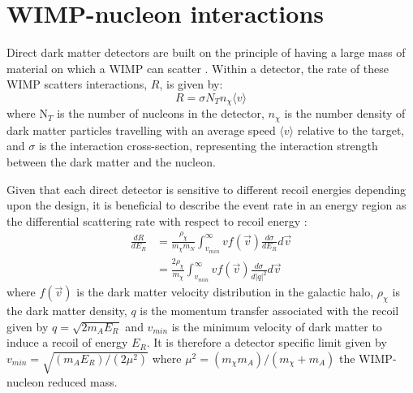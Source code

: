 \section{WIMP-nucleon interactions} \label{sec:wimp_nucleus_interactions}

Direct dark matter detectors are built on the principle of having a large mass of material on which a WIMP can scatter \cite{direct_detection_of_wimps_ref}.
Within a detector, the rate of these WIMP scatters interactions, $R$, is given by:
\begin{equation}
    R = \sigma N_{T} n_{\chi} \langle v \rangle
    \label{eq:wimp_nucleon_rate}
\end{equation}
where N$_{T}$ is the number of nucleons in the detector, $n_\chi$ is the number density of dark matter particles travelling with an average speed $\langle v \rangle$ relative to the target, and $\sigma$ is the interaction cross-section, representing the interaction strength between the dark matter and the nucleon.
\par
Given that each direct detector is sensitive to different recoil energies depending upon the design, it is beneficial to describe the event rate in an energy region as the differential scattering rate with respect to recoil energy \cite{supersymetry_wimpy_boi_ref}:
\begin{equation}
\begin{split}
    \frac{dR}{dE_R} &= \frac{\rho_{\chi}}{m_\chi m_N} \int^{\infty}_{v_{min}} v f(\vec{v}) \frac{d\sigma}{dE_R} d\vec{v} \\
                    &= \frac{2\rho_{\chi}}{m_\chi} \int^{\infty}_{v_{min}} v f(\vec{v}) \frac{d\sigma}{d |q|^2} d\vec{v}
\end{split}
\label{eq:wimp_differential_rate}
\end{equation}
where $f(\vec{v})$ is the dark matter velocity distribution in the galactic halo, $\rho_{\chi}$ is the dark matter density, $q$ is the momentum transfer associated with the recoil given by $q = \sqrt{2m_A E_R}$ and $v_{min}$ is the minimum velocity of dark matter to induce a recoil of energy $E_R$.
It is therefore a detector specific limit given by $v_{min} = \sqrt{(m_A E_R)/(2\mu^2)}$ where $\mu^2 = (m_\chi m_A)/(m_\chi + m_A)$ the WIMP-nucleon reduced mass.
